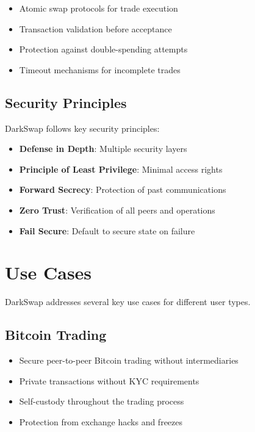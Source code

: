 \documentclass[11pt,a4paper]{article}
\begin{document}
\begin{itemize}
    \item Atomic swap protocols for trade execution
    \item Transaction validation before acceptance
    \item Protection against double-spending attempts
    \item Timeout mechanisms for incomplete trades
\end{itemize}

\subsection{Security Principles}

DarkSwap follows key security principles:

\begin{itemize}
    \item \textbf{Defense in Depth}: Multiple security layers
    \item \textbf{Principle of Least Privilege}: Minimal access rights
    \item \textbf{Forward Secrecy}: Protection of past communications
    \item \textbf{Zero Trust}: Verification of all peers and operations
    \item \textbf{Fail Secure}: Default to secure state on failure
\end{itemize}

\section{Use Cases}

DarkSwap addresses several key use cases for different user types.

\subsection{Bitcoin Trading}

\begin{itemize}
    \item Secure peer-to-peer Bitcoin trading without intermediaries
    \item Private transactions without KYC requirements
    \item Self-custody throughout the trading process
    \item Protection from exchange hacks and freezes
\end{itemize}
\end{document}
